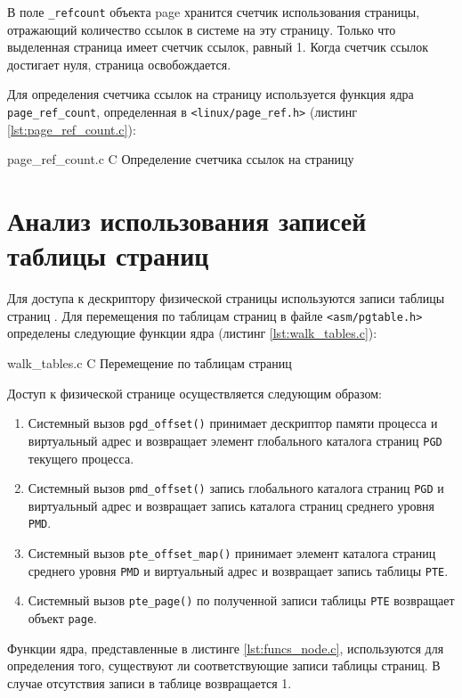В поле \texttt{\_refcount} объекта page хранится счетчик использования страницы, отражающий количество ссылок в системе на эту страницу. Только что выделенная страница имеет счетчик ссылок, равный 1. Когда счетчик ссылок достигает нуля, страница освобождается.

Для определения счетчика ссылок на страницу используется функция ядра \texttt{page\_ref\_count}, определенная в \texttt{<linux/page\_ref.h>} (листинг \ref{lst:page_ref_count.c}):

    {page_ref_count.c}
    {C}
    {Определение счетчика ссылок на страницу}
    
\section{Анализ использования записей таблицы страниц}

Для доступа к дескриптору физической страницы используются записи таблицы страниц \cite{tables}. Для перемещения по таблицам страниц в файле \texttt{<asm/pgtable.h>} определены следующие функции ядра (листинг \ref{lst:walk_tables.c}):

    {walk_tables.c}
    {C}
    {Перемещение по таблицам страниц}
    
Доступ к физической странице осуществляется следующим образом:

\begin{enumerate}
	\item Системный вызов \texttt{pgd\_offset()} принимает дескриптор памяти процесса и виртуальный адрес и возвращает элемент глобального каталога страниц \texttt{PGD} текущего процесса.
	\item Системный вызов \texttt{pmd\_offset()} запись глобального каталога страниц \texttt{PGD} и виртуальный адрес и возвращает запись каталога страниц среднего уровня \texttt{PMD}.
	\item Системный вызов \texttt{pte\_offset\_map()} принимает элемент каталога страниц среднего уровня \texttt{PMD} и виртуальный адрес и возвращает запись таблицы \texttt{PTE}.
	\item Системный вызов \texttt{pte\_page()} по полученной записи таблицы \texttt{PTE} возвращает объект \texttt{page}.
\end{enumerate}

Функции ядра, представленные в листинге \ref{lst:funcs_node.c}, используются для определения того, существуют ли соответствующие записи таблицы страниц. В случае отсутствия записи в таблице возвращается 1.
    
